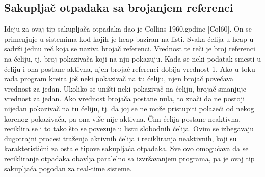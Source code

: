 \subsection{Sakupljač otpadaka sa brojanjem referenci}
\label{ref:reference counter}

Ideju za ovaj tip sakupljača otpadaka dao je Collins 1960.godine [Col60]. On se primenjuje u sistemima kod kojih je heap baziran na listi. Svaka ćelija u heap-u sadrži jednu reč koja se naziva brojač referenci. Vrednost te reči je broj referenci na ćeliju, tj. broj pokazivača koji na nju pokazuju. Kada se neki podatak smesti u ćeliju i ona postane aktivna, njen brojač referenci dobija vrednost 1. Ako u toku rada program kreira još neki pokazivač na tu ćeliju, njen brojač povećava vrednost za jedan. Ukoliko se uništi neki pokazivač na ćeliju, brojač smanjuje vrednost za jedan. Ako vrednost brojača postane nula, to znači da ne postoji nijedan pokazivač na tu ćeliju, tj. da joj se ne može pristupiti polazeći od nekog korenog pokazivača, pa ona više nije aktivna. Čim ćelija postane neaktivna, reciklira se i to tako što se povezuje u listu slobodnih ćelija. Ovim se izbegavaju dugotrajni procesi traženja aktivnih ćelija i recikliranja neaktivnih, koji su karakteristični za ostale tipove sakupljača otpadaka. Sve ovo omogućava da se recikliranje otpadaka obavlja paralelno sa izvršavanjem programa, pa je ovaj tip sakupljača pogodan za real-time sisteme.


